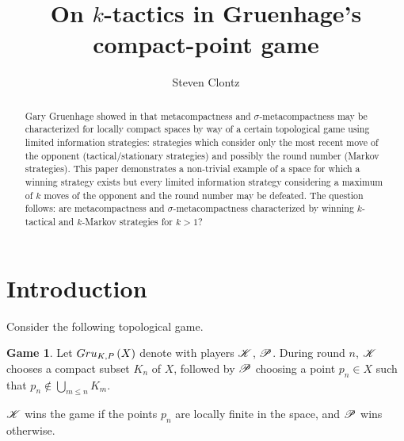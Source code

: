 \documentclass{amsart}
\theoremstyle{definition}
\newtheorem{game}[theorem]{Game}
\begin{document}
\title{On $k$-tactics in Gruenhage's compact-point game}




\author{Steven Clontz}
\address{Department of Mathematics, Auburn University,
Auburn, AL 36830}




\begin{abstract}
Gary Gruenhage showed in \cite{MR858337} that metacompactness and\break
$\sigma$-metacompactness may be characterized for locally compact spaces
by way of a certain topological game using limited information strategies:
strategies
which consider only the most recent move of the opponent (tactical/stationary
strategies) and possibly the round number (Markov strategies). This paper
demonstrates a non-trivial example of a space for which a winning strategy
exists but every limited information strategy considering a maximum of $k$
moves of the opponent and the round number may be defeated. The question
follows: are metacompactness and $\sigma$-metacompactness characterized by
winning $k$-tactical and $k$-Markov strategies for $k>1$?
\end{abstract}


\maketitle

\section{Introduction}

Consider the following topological game.

\begin{game}
  Let $Gru_{K,P}\left({X}\right)$ denote 
  with players $\mathscr{K}$, $\mathscr{P}$. During round $n$, $\mathscr{K}$ chooses
  a compact subset $K_n$ of $X$, followed by $\mathscr{P}$ choosing a point
  $p_n\in X$ such that $p_n\not\in \bigcup_{m\leq n}K_m$.

  $\mathscr{K}$ wins the game if the points $p_n$ are locally
  finite in the space, and $\mathscr{P}$ wins otherwise.
\end{game}
\end{document}
